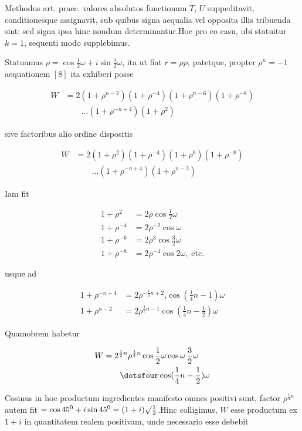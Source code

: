 
Methodus art. praec. valores absolutos functionum $T$, $U$ suppeditavit, conditionesque assignavit, sub quibus signa aequalia vel opposita illis tribuenda sint: sed signa ipsa hinc nondum determinantur.\quad Hoc pro eo casu, ubi statuitur $k=1$, sequenti modo supplebimus.

Statuamus $\rho=\cos\frac12\omega+i\sin\frac12\omega$, ita ut fiat $r=\rho\rho$, patetque, propter $\rho^n=-1$ aequationem $[8]$ ita exhiberi posse

\[
\begin{aligned}
W&=2(1+\rho^{n-2})(1+\rho^{-4})(1+\rho^{n-6})(1+\rho^{-8})\\&\qquad\ldots(1+\rho^{-n+4})(1+\rho^2)
\end{aligned}
\]

sive factoribus alio ordine dispositis

\[
\begin{aligned}
W&=2(1+\rho^2)(1+\rho^{-4})(1+\rho^6)(1+\rho^{-8})\\&\qquad\ldots(1+\rho^{-n+4})(1+\rho^{n-2})
\end{aligned}
\]

Iam fit

\[
\begin{aligned}
1+\rho^2&=2\rho\cos\frac12\omega\\
1+\rho^{-4}&=2\rho^{-2}\cos\omega\\
1+\rho^{-6}&=2\rho^3\cos\frac32\omega\\
1+\rho^{-8}&=2\rho^{-4}\cos2\omega,\;\text{etc.}
\end{aligned}
\]

usque ad

\[
\begin{aligned}
1+\rho^{-n+4}&=2\rho^{-\frac12n+2}\mathord{,}\cos(\frac14n-1)\omega\\
1+\rho^{n-2}&=2\rho^{\frac12n-1}\cos(\frac14n-\frac12)\omega
\end{aligned}
\]

Quamobrem habetur


\[
\begin{aligned}
W&=2^{\frac12n}\rho^{\frac14n}\cos\frac12\omega\cos\omega\,\frac32\omega\\&\qquad\dotsfour\cos(\frac14n-\frac12)\omega
\end{aligned}
\]

Cosinus in hoc productum ingredientes manifesto omnes positivi sunt, factor $\rho^{\frac14n}$ autem fit $=\cos45^0+i\sin45^0=(1+i)\surd\frac12$.\quad Hinc colligimus, $W$ esse productum ex $1+i$ in quantitatem realem positivam, unde necessario esse debebit

